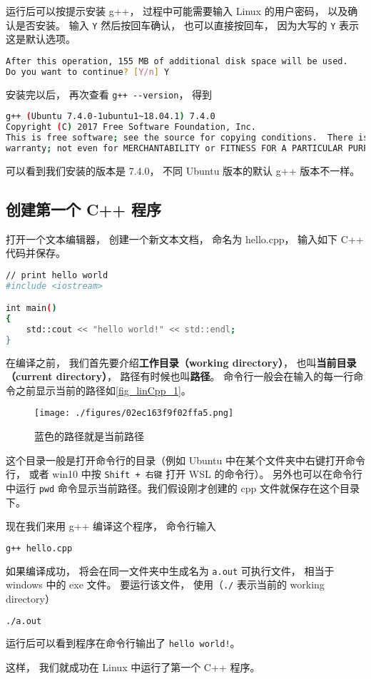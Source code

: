 运行后可以按提示安装 g++， 过程中可能需要输入 Linux 的用户密码， 以及确认是否安装。 输入 \verb|Y| 然后按回车确认， 也可以直接按回车， 因为大写的 \verb|Y| 表示这是默认选项。
\begin{lstlisting}[language=bash]
After this operation, 155 MB of additional disk space will be used.
Do you want to continue? [Y/n] Y
\end{lstlisting}

安装完以后， 再次查看 \verb|g++ --version|， 得到
\begin{lstlisting}[language=bash]
g++ (Ubuntu 7.4.0-1ubuntu1~18.04.1) 7.4.0
Copyright (C) 2017 Free Software Foundation, Inc.
This is free software; see the source for copying conditions.  There is NO
warranty; not even for MERCHANTABILITY or FITNESS FOR A PARTICULAR PURPOSE.
\end{lstlisting}
可以看到我们安装的版本是 7.4.0， 不同 Ubuntu 版本的默认 g++ 版本不一样。


\subsection{创建第一个 C++ 程序}
打开一个文本编辑器， 创建一个新文本文档， 命名为 hello.cpp， 输入如下 C++ 代码并保存。
\begin{lstlisting}[language=bash, caption=hello.cpp]
// print hello world
#include <iostream>

int main()
{
    std::cout << "hello world!" << std::endl;
}
\end{lstlisting}
在编译之前， 我们首先要介绍\textbf{工作目录（working directory）}， 也叫\textbf{当前目录（current directory）}， 路径有时候也叫\textbf{路径}。 命令行一般会在输入的每一行命令之前显示当前的路径如\autoref{fig_linCpp_1}。
\begin{figure}[ht]
\centering
\texttt{[image: ./figures/02ec163f9f02ffa5.png]}
\caption{蓝色的路径就是当前路径} \label{fig_linCpp_1}
\end{figure}

这个目录一般是打开命令行的目录（例如 Ubuntu 中在某个文件夹中右键打开命令行， 或者 win10 中按 \verb|Shift + 右键| 打开 WSL 的命令行）。 另外也可以在命令行中运行 \verb|pwd| 命令显示当前路径。我们假设刚才创建的 cpp 文件就保存在这个目录下。

现在我们来用 g++ 编译这个程序， 命令行输入
\begin{lstlisting}[language=bash]
g++ hello.cpp
\end{lstlisting}
如果编译成功， 将会在同一文件夹中生成名为 \verb|a.out| 可执行文件， 相当于 windows 中的 exe 文件。 要运行该文件， 使用（\verb|./| 表示当前的 working directory）
\begin{lstlisting}[language=bash]
./a.out
\end{lstlisting}
运行后可以看到程序在命令行输出了 \verb|hello world!|。

这样， 我们就成功在 Linux 中运行了第一个 C++ 程序。
